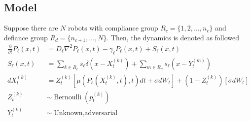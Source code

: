 \documentclass[12pt]{article}
\begin{document}
\subsection{Model}
Suppose there are $N$ robots with compliance group $R_c = \{1,2,\dots,n_c\}$ and defiance group $R_d = \{n_{c+1},\dots,N\}$. Then, the dynamics is denoted as followed
\begin{align*}
  \frac{\partial}{\partial t} P_{\ell}(x,t) &= D_\ell \nabla^2 P_\ell (x,t) - \gamma_\ell P_\ell(x,t) + S_{\ell}(x,t)\\
  S_\ell(x,t) &= \sum_{k\in R_c} s_\ell\delta(x-X_t^{(k)}) + \sum_{m\in R_d}s_\ell(x-Y_t^{(m)})\\
  dX_t^{(k)} &= Z_t^{(k)}\left[\mu(P_\ell(X_t^{(k)},t),t)dt + \sigma dW_t\right] + (1-Z_t^{(k)})\left[\sigma dW_t\right]\\
  Z_t^{(k)} &\sim \operatorname{Bernoulli}(p^{(k)}_t)\\
  Y_t^{(k)} &\sim \operatorname{Unknown, adversarial}
\end{align*}
\end{document}
